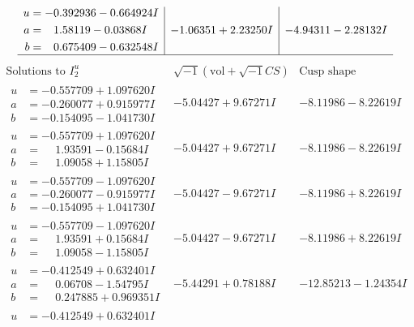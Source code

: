 \documentclass[1p]{elsarticle_modified}
\theoremstyle{definition}
\newcommand{\I}{\sqrt{-1}}
\begin{document}
$$\begin{array}{c|c|c}
\begin{aligned}
u &= -0.392936 - 0.664924 I \\
a &= \phantom{-}1.58119 - 0.03868 I \\
b &= \phantom{-}0.675409 - 0.632548 I\end{aligned}
 & -1.06351 + 2.23250 I & -4.94311 - 2.28132 I\\
 \hline 
 \end{array}$$\newpage$$\begin{array}{c|c|c}  
\text{Solutions to }I^u_{2}& \I (\text{vol} + \sqrt{-1}CS) & \text{Cusp shape}\\
 \hline 
\begin{aligned}
u &= -0.557709 + 1.097620 I \\
a &= -0.260077 + 0.915977 I \\
b &= -0.154095 - 1.041730 I\end{aligned}
 & -5.04427 + 9.67271 I & -8.11986 - 8.22619 I \\ \hline\begin{aligned}
u &= -0.557709 + 1.097620 I \\
a &= \phantom{-}1.93591 - 0.15684 I \\
b &= \phantom{-}1.09058 + 1.15805 I\end{aligned}
 & -5.04427 + 9.67271 I & -8.11986 - 8.22619 I \\ \hline\begin{aligned}
u &= -0.557709 - 1.097620 I \\
a &= -0.260077 - 0.915977 I \\
b &= -0.154095 + 1.041730 I\end{aligned}
 & -5.04427 - 9.67271 I & -8.11986 + 8.22619 I \\ \hline\begin{aligned}
u &= -0.557709 - 1.097620 I \\
a &= \phantom{-}1.93591 + 0.15684 I \\
b &= \phantom{-}1.09058 - 1.15805 I\end{aligned}
 & -5.04427 - 9.67271 I & -8.11986 + 8.22619 I \\ \hline\begin{aligned}
u &= -0.412549 + 0.632401 I \\
a &= \phantom{-}0.06708 - 1.54795 I \\
b &= \phantom{-}0.247885 + 0.969351 I\end{aligned}
 & -5.44291 + 0.78188 I & -12.85213 - 1.24354 I \\ \hline\begin{aligned}
u &= -0.412549 + 0.632401 I \\

\end{aligned}
\end{array}$$
\end{document}
